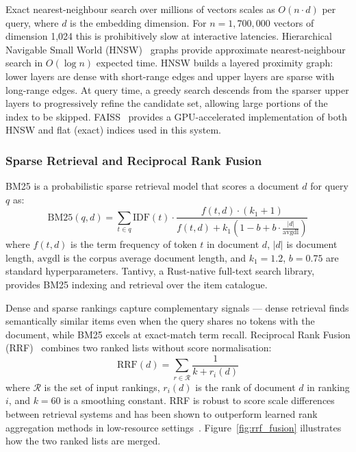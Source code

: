 Exact nearest-neighbour search over millions of vectors scales as $O(n \cdot d)$ per query, where $d$ is the embedding dimension.
For $n = 1{,}700{,}000$ vectors of dimension 1{,}024 this is prohibitively slow at interactive latencies.
Hierarchical Navigable Small World (HNSW)~\cite{malkov2018hnsw} graphs provide approximate nearest-neighbour search in $O(\log n)$ expected time.
HNSW builds a layered proximity graph: lower layers are dense with short-range edges and upper layers are sparse with long-range edges.
At query time, a greedy search descends from the sparser upper layers to progressively refine the candidate set, allowing large portions of the index to be skipped.
FAISS~\cite{johnson2021faiss} provides a GPU-accelerated implementation of both HNSW and flat (exact) indices used in this system.

\subsubsection{Sparse Retrieval and Reciprocal Rank Fusion}

BM25 is a probabilistic sparse retrieval model that scores a document $d$ for query $q$ as:
\begin{equation}
  \text{BM25}(q, d) = \sum_{t \in q} \text{IDF}(t) \cdot \frac{f(t, d) \cdot (k_1 + 1)}{f(t, d) + k_1 \left(1 - b + b \cdot \frac{|d|}{\text{avgdl}}\right)}
\end{equation}
where $f(t, d)$ is the term frequency of token $t$ in document $d$, $|d|$ is document length, $\text{avgdl}$ is the corpus average document length, and $k_1 = 1.2$, $b = 0.75$ are standard hyperparameters.
Tantivy, a Rust-native full-text search library, provides BM25 indexing and retrieval over the item catalogue.

Dense and sparse rankings capture complementary signals — dense retrieval finds semantically similar items even when the query shares no tokens with the document, while BM25 excels at exact-match term recall.
Reciprocal Rank Fusion (RRF)~\cite{cormack2009rrf} combines two ranked lists without score normalisation:
\begin{equation}
  \text{RRF}(d) = \sum_{r \in \mathcal{R}} \frac{1}{k + r_i(d)}
\end{equation}
where $\mathcal{R}$ is the set of input rankings, $r_i(d)$ is the rank of document $d$ in ranking $i$, and $k = 60$ is a smoothing constant.
RRF is robust to score scale differences between retrieval systems and has been shown to outperform learned rank aggregation methods in low-resource settings~\cite{cormack2009rrf}.
Figure~\ref{fig:rrf_fusion} illustrates how the two ranked lists are merged.

